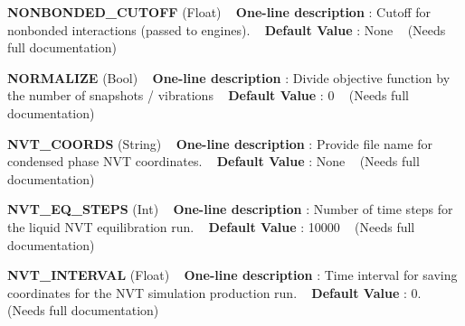 \begin{DoxyItemize}
\item {\bfseries  N\+O\+N\+B\+O\+N\+D\+E\+D\+\_\+\+C\+U\+T\+O\+FF } (Float) ~\newline
{\bfseries  One-\/line description }\+: Cutoff for nonbonded interactions (passed to engines). ~\newline
{\bfseries  Default Value }\+: None ~\newline
(Needs full documentation)\end{DoxyItemize}
\begin{DoxyItemize}
\item {\bfseries  N\+O\+R\+M\+A\+L\+I\+ZE } (Bool) ~\newline
{\bfseries  One-\/line description }\+: Divide objective function by the number of snapshots / vibrations ~\newline
{\bfseries  Default Value }\+: 0 ~\newline
(Needs full documentation)\end{DoxyItemize}
\begin{DoxyItemize}
\item {\bfseries  N\+V\+T\+\_\+\+C\+O\+O\+R\+DS } (String) ~\newline
{\bfseries  One-\/line description }\+: Provide file name for condensed phase N\+VT coordinates. ~\newline
{\bfseries  Default Value }\+: None ~\newline
(Needs full documentation)\end{DoxyItemize}
\begin{DoxyItemize}
\item {\bfseries  N\+V\+T\+\_\+\+E\+Q\+\_\+\+S\+T\+E\+PS } (Int) ~\newline
{\bfseries  One-\/line description }\+: Number of time steps for the liquid N\+VT equilibration run. ~\newline
{\bfseries  Default Value }\+: 10000 ~\newline
(Needs full documentation)\end{DoxyItemize}
\begin{DoxyItemize}
\item {\bfseries  N\+V\+T\+\_\+\+I\+N\+T\+E\+R\+V\+AL } (Float) ~\newline
{\bfseries  One-\/line description }\+: Time interval for saving coordinates for the N\+VT simulation production run. ~\newline
{\bfseries  Default Value }\+: 0. ~\newline
(Needs full documentation)\end{DoxyItemize}
